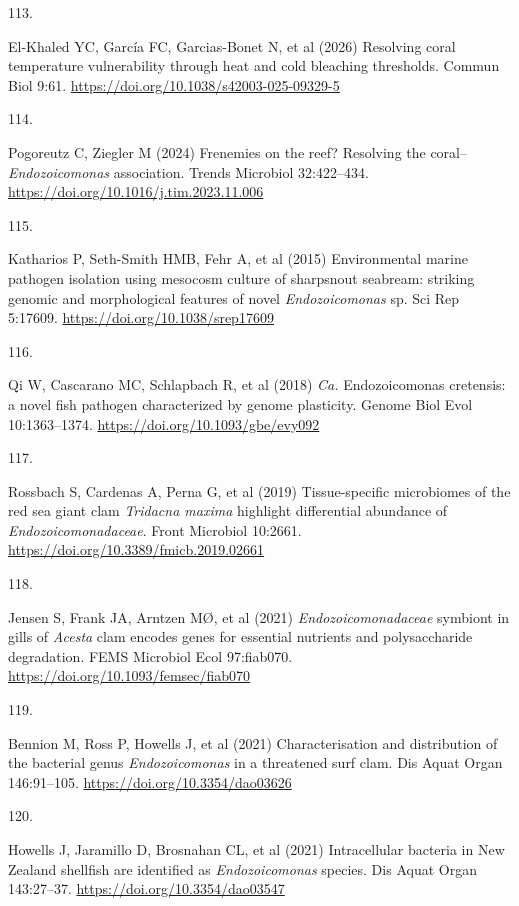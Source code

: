 \documentclass[
  12 pt,
]{article}
\newlength{\cslhangindent}
\newlength{\csllabelwidth}
\newenvironment{CSLReferences}[2] %
 {\begin{list}{}{%
  \setlength{\itemindent}{0pt}
  \setlength{\leftmargin}{0pt}
  \setlength{\parsep}{0pt}
  \ifodd #1
   \setlength{\leftmargin}{\cslhangindent}
   \setlength{\itemindent}{-1\cslhangindent}
  \fi
  \setlength{\itemsep}{#2\baselineskip}}}
 {\end{list}}
\newcommand{\CSLLeftMargin}[1]{\parbox[t]{\csllabelwidth}{\strut#1\strut}}
\newcommand{\CSLRightInline}[1]{\parbox[t]{\linewidth - \csllabelwidth}{\strut#1\strut}}
\begin{document}
\begin{CSLReferences}{0}{0}
\CSLLeftMargin{113. }%
\CSLRightInline{El-Khaled YC, García FC, Garcias-Bonet N, et al (2026) Resolving coral temperature vulnerability through heat and cold bleaching thresholds. Commun Biol 9:61. \url{https://doi.org/10.1038/s42003-025-09329-5}}

\CSLLeftMargin{114. }%
\CSLRightInline{Pogoreutz C, Ziegler M (2024) Frenemies on the reef? Resolving the coral--{\emph{Endozoicomonas}} association. Trends Microbiol 32:422--434. \url{https://doi.org/10.1016/j.tim.2023.11.006}}

\CSLLeftMargin{115. }%
\CSLRightInline{Katharios P, Seth-Smith HMB, Fehr A, et al (2015) Environmental marine pathogen isolation using mesocosm culture of sharpsnout seabream: striking genomic and morphological features of novel {\emph{Endozoicomonas}} sp. Sci Rep 5:17609. \url{https://doi.org/10.1038/srep17609}}

\CSLLeftMargin{116. }%
\CSLRightInline{Qi W, Cascarano MC, Schlapbach R, et al (2018) {\emph{Ca.}} Endozoicomonas cretensis: a novel fish pathogen characterized by genome plasticity. Genome Biol Evol 10:1363--1374. \url{https://doi.org/10.1093/gbe/evy092}}

\CSLLeftMargin{117. }%
\CSLRightInline{Rossbach S, Cardenas A, Perna G, et al (2019) Tissue-specific microbiomes of the red sea giant clam {\emph{Tridacna maxima}} highlight differential abundance of {\emph{Endozoicomonadaceae}}. Front Microbiol 10:2661. \url{https://doi.org/10.3389/fmicb.2019.02661}}

\CSLLeftMargin{118. }%
\CSLRightInline{Jensen S, Frank JA, Arntzen MØ, et al (2021) {\emph{Endozoicomonadaceae}} symbiont in gills of {\emph{Acesta}} clam encodes genes for essential nutrients and polysaccharide degradation. FEMS Microbiol Ecol 97:fiab070. \url{https://doi.org/10.1093/femsec/fiab070}}

\CSLLeftMargin{119. }%
\CSLRightInline{Bennion M, Ross P, Howells J, et al (2021) Characterisation and distribution of the bacterial genus {\emph{Endozoicomonas}} in a threatened surf clam. Dis Aquat Organ 146:91--105. \url{https://doi.org/10.3354/dao03626}}

\CSLLeftMargin{120. }%
\CSLRightInline{Howells J, Jaramillo D, Brosnahan CL, et al (2021) Intracellular bacteria in New Zealand shellfish are identified as {\emph{Endozoicomonas}} species. Dis Aquat Organ 143:27--37. \url{https://doi.org/10.3354/dao03547}}


\end{CSLReferences}
\end{document}
